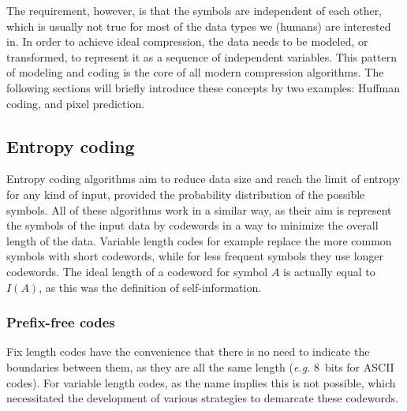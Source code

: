       The requirement, however, is that the symbols are independent of each other, which is usually not true for most of the data types we (humans) are interested in. In order to achieve ideal compression, the data needs to be modeled, or transformed, to represent it as a sequence of independent variables. This pattern of modeling and coding \cite{rissanen_universal_1981} is the core of all modern compression algorithms. 
      The following sections will briefly introduce these concepts by two examples: Huffman coding, and pixel prediction.
      
      
    \subsection{Entropy coding}
      \label{sec:entropyCoding}

      Entropy coding algorithms aim to reduce data size and reach the limit of entropy for any kind of input, provided the probability distribution of the possible symbols. All of these algorithms work in a similar way, as their aim is represent the symbols of the input data by codewords in a way to minimize the overall length of the data. Variable length codes for example replace the more common symbols with short codewords, while for less frequent symbols they use longer codewords. The ideal length of a codeword for symbol $A$ is actually equal to $I(A)$, as this was the definition of self-information.


      \subsubsection{Prefix-free codes}

      Fix length codes have the convenience that there is no need to indicate the boundaries between them, as they are all the same length (\textit{e.g.} \SI{8}{bits} for ASCII codes). For variable length codes, as the name implies this is not possible, which necessitated the development of various strategies to demarcate these codewords. 

